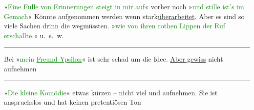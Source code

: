            \pstart
           »\textcolor{green}{Eine Fülle von Erinnerungen steigt in
                  mir auf}{}«\pend
           \pstart
           vorher noch »\textcolor{green}{und stille ist’s im
                  Gemach}{}«\pend
           \pstart
           {\pb}\textcolor{green}{}{}\ledrightnote{\textcolor{green}{Die kleine Komödie}}\pend
           \pstart
           {\pb}Könnte aufgenommen werden wenn
                  \introOben{}stark\introOben{}{ }\uline{überarbeitet}. Aber es sind so viele Sachen drinn die
               wegmüssten.\pend
           \pstart
           »\textcolor{green}{wie von ihren rothen Lippen der Ruf
                  erschallte.}{}« u. s. w.\pend
           \noindent\rule{\textwidth}{0.5pt}\pstart
           Bei »\textcolor{green}{mein \uline{Freund Ypsilon}}{}\ledrightnote{\textcolor{green}{Mein Freund Ypsilon}}« ist sehr schad um die Idee. \uline{Aber gewiss} nicht
               aufnehmen\pend
           \noindent\rule{\textwidth}{0.5pt}\pstart
           »\textcolor{green}{Die kleine Komödie}{}\ledrightnote{\textcolor{green}{Die kleine Komödie}}«\pend
           \pstart
           etwas kürzen – nicht viel und aufnehmen. Sie ist anspruchslos und hat keinen
               pretentiösen Ton\pend
           \endnumbering{}  
      